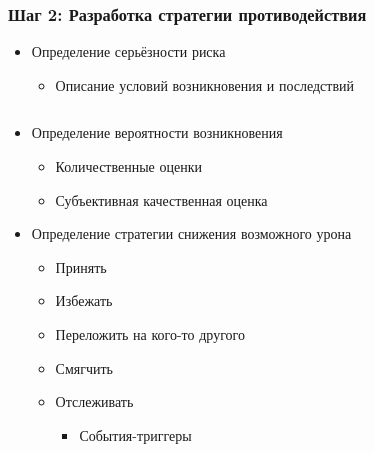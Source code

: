 \documentclass{../../slides-style}
\begin{document}
    \begin{frame}
        \frametitle{Шаг 2: Разработка стратегии противодействия}
        \begin{itemize}
            \item Определение серьёзности риска
            \begin{itemize}
                \item Описание условий возникновения и последствий
            \end{itemize}
        \end{itemize}
        \begin{columns}
            \begin{column}{0.6\textwidth}
                \begin{itemize}
                    \item Определение вероятности возникновения
                    \begin{itemize}
                        \item Количественные оценки
                        \item Субъективная качественная оценка
                    \end{itemize}
                    \item Определение стратегии снижения возможного урона
                    \begin{itemize}
                        \item Принять
                        \item Избежать
                        \item Переложить на кого-то другого
                        \item Смягчить
                        \item Отслеживать
                        \begin{itemize}
                            \item События-триггеры
                        \end{itemize}
                    \end{itemize}
                \end{itemize}
            \end{column}
            \begin{column}{0.4\textwidth}
                \begin{center}

\end{center}
\end{column}
\end{columns}
\end{frame}
\end{document}
